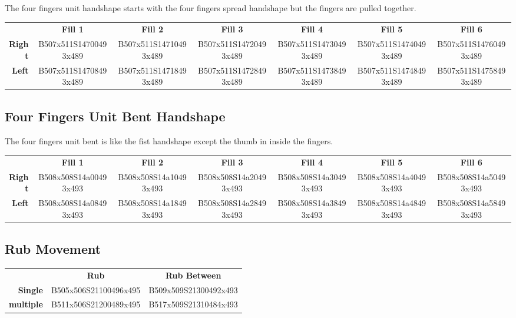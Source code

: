 \documentclass{article}
\begin{document}
The four fingers unit handshape starts with the four fingers spread handshape but the fingers are pulled together.

\begin{center}
\begin{tabular}{r*{6}{c}}
&\textbf{Fill 1}&\textbf{Fill 2}&\textbf{Fill 3}&\textbf{Fill 4}&\textbf{Fill 5}&\textbf{Fill 6}\\
\textbf{Right}&
B507x511S14700493x489&
B507x511S14710493x489&
B507x511S14720493x489&
B507x511S14730493x489&
B507x511S14740493x489&
B507x511S14760493x489\\
\textbf{Left}&
B507x511S14708493x489&
B507x511S14718493x489&
B507x511S14728493x489&
B507x511S14738493x489&
B507x511S14748493x489&
B507x511S14758493x489\\
\end{tabular}
\end{center}

\subsection{Four Fingers Unit Bent Handshape}

The four fingers unit bent is like the fist handshape except the thumb in inside the fingers.

\begin{center}
\begin{tabular}{r*{6}{c}}
&\textbf{Fill 1}&\textbf{Fill 2}&\textbf{Fill 3}&\textbf{Fill 4}&\textbf{Fill 5}&\textbf{Fill 6}\\
\textbf{Right}&
B508x508S14a00493x493&
B508x508S14a10493x493&
B508x508S14a20493x493&
B508x508S14a30493x493&
B508x508S14a40493x493&
B508x508S14a50493x493\\
\textbf{Left}&
B508x508S14a08493x493&
B508x508S14a18493x493&
B508x508S14a28493x493&
B508x508S14a38493x493&
B508x508S14a48493x493&
B508x508S14a58493x493\\
\end{tabular}
\end{center}

\subsection{Rub Movement}

\begin{center}
\begin{tabular}{r*{2}{c}}
&\textbf{Rub}&\textbf{Rub Between}\\
\textbf{Single}  &B505x506S21100496x495&B509x509S21300492x493\\
\textbf{multiple}&B511x506S21200489x495&B517x509S21310484x493\\
\end{tabular}
\end{center}
\end{document}
